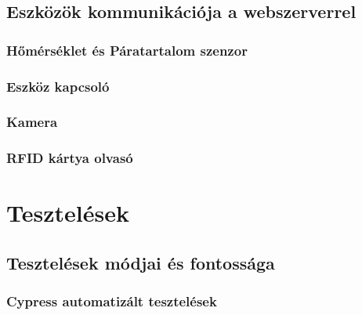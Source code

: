 \documentclass[
]{thesis-ekf}
\theoremstyle{definition}
\theoremstyle{remark}
\begin{document}
	\section{Eszközök kommunikációja a webszerverrel}
	\subsection{Hőmérséklet és Páratartalom szenzor}
	\subsection{Eszköz kapcsoló}
	\subsection{Kamera}
	\subsection{RFID kártya olvasó}
	
	
	\chapter{Tesztelések}
	\section{Tesztelések módjai és fontossága}
	
	\subsection{Cypress automatizált tesztelések}
\end{document}
